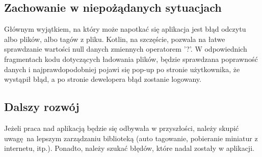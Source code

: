 \subsection{Zachowanie w niepożądanych sytuacjach}

Głównym wyjątkiem, na który może napotkać się aplikacja jest błąd odczytu albo plików, albo tagów z pliku. Kotlin, na szczęście, pozwala na łatwe sprawdzanie wartości null danych zmiennych operatorem '?'. W odpowiednich fragmentach kodu dotyczących ładowania plików, będzie sprawdzana poprawność danych i najprawdopodobniej pojawi się pop-up po stronie użytkownika, że wystąpił błąd, a po stronie dewelopera błąd zostanie logowany.

\subsection{Dalszy rozwój}

Jeżeli praca nad aplikacją będzie się odbywała w przyszłości, należy skupić uwagę na lepszym zarządzaniu biblioteką (auto tagowanie, pobieranie miniatur z internetu, itp.). Ponadto, należy szukać błędów, które nadal zostały w aplikacji.
